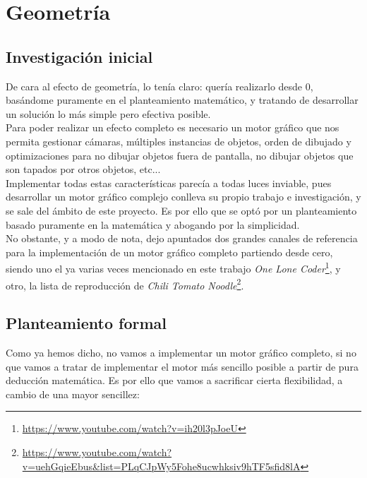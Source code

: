 \section{Geometría} \label{sec:geometry}

\subsection{Investigación inicial}

De cara al efecto de geometría, lo tenía claro: quería realizarlo desde 0, basándome puramente en el planteamiento matemático, y tratando de desarrollar un solución lo más simple pero efectiva posible.\\

Para poder realizar un efecto completo es necesario un motor gráfico que nos permita gestionar cámaras, múltiples instancias de objetos, orden de dibujado y optimizaciones para no dibujar objetos fuera de pantalla, no dibujar objetos que son tapados por otros objetos, etc...\\

Implementar todas estas características parecía a todas luces inviable, pues desarrollar un motor gráfico complejo conlleva su propio trabajo e investigación, y se sale del ámbito de este proyecto. Es por ello que se optó por un planteamiento basado puramente en la matemática y abogando por la simplicidad.\\

No obstante, y a modo de nota, dejo apuntados dos grandes canales de referencia para la implementación de un motor gráfico completo partiendo desde cero, siendo uno el ya varias veces mencionado en este trabajo \emph{One Lone Coder}\footnote{\url{https://www.youtube.com/watch?v=ih20l3pJoeU}}, y otro, la lista de reproducción de \emph{Chili Tomato Noodle}\footnote{\url{https://www.youtube.com/watch?v=uehGqieEbus&list=PLqCJpWy5Fohe8ucwhksiv9hTF5sfid8lA}}.

\subsection{Planteamiento formal}

Como ya hemos dicho, no vamos a implementar un motor gráfico completo, si no que vamos a tratar de implementar el motor más sencillo posible a partir de pura deducción matemática. Es por ello que vamos a sacrificar cierta flexibilidad, a cambio de una mayor sencillez:

